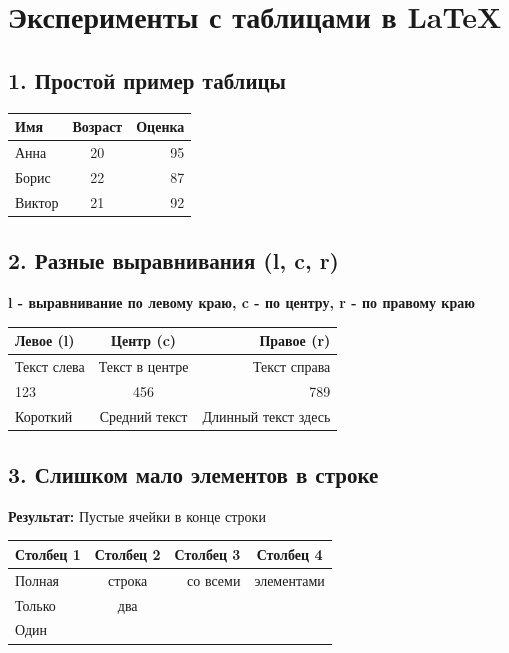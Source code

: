 \documentclass[12pt,a4paper]{article}
\begin{document}
\section*{Эксперименты с таблицами в LaTeX}

\subsection*{1. Простой пример таблицы}

\begin{tabular}{|l|c|r|}
\hline
Имя & Возраст & Оценка \\
\hline
Анна & 20 & 95 \\
Борис & 22 & 87 \\
Виктор & 21 & 92 \\
\hline
\end{tabular}

\vspace{1cm}

\subsection*{2. Разные выравнивания (l, c, r)}

\textbf{l - выравнивание по левому краю, c - по центру, r - по правому краю}

\vspace{0.5cm}

\begin{tabular}{|l|c|r|}
\hline
\textbf{Левое (l)} & \textbf{Центр (c)} & \textbf{Правое (r)} \\
\hline
Текст слева & Текст в центре & Текст справа \\
123 & 456 & 789 \\
Короткий & Средний текст & Длинный текст здесь \\
\hline
\end{tabular}

\vspace{1cm}

\subsection*{3. Слишком мало элементов в строке}

\textbf{Результат:} Пустые ячейки в конце строки

\vspace{0.5cm}

\begin{tabular}{|l|c|r|c|}
\hline
Столбец 1 & Столбец 2 & Столбец 3 & Столбец 4 \\
\hline
Полная & строка & со всеми & элементами \\
\hline
Только & два & & \\
\hline
Один & & & \\
\hline
\end{tabular}
\end{document}
